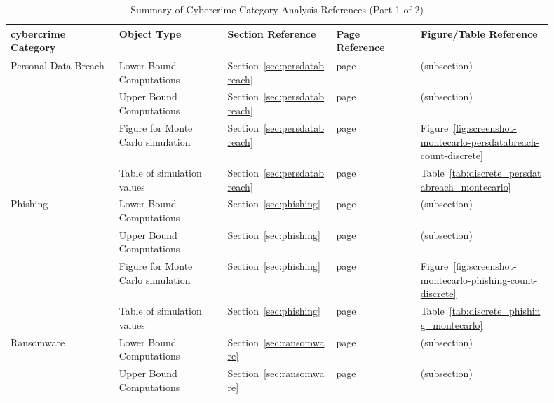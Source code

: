 \begin{table}[H]
  \centering
  \caption{Summary of Cybercrime Category Analysis References (Part 1 of 2)}
  \label{tab:cybercrime-anova-summary-1}
  \small
  \begin{tabular}{@{}p{0.18\linewidth}p{0.18\linewidth}p{0.18\linewidth}p{0.14\linewidth}p{0.22\linewidth}@{}}
    \toprule
    \textbf{\gls{cybercrime} Category} & \textbf{Object Type} & \textbf{Section Reference} & \textbf{Page Reference} & \textbf{Figure/Table Reference} \\
    \midrule
    Personal Data Breach & Lower Bound Computations & Section~\ref{sec:persdatabreach} & page~\pageref{sec:persdatabreach} & (subsection) \\
    & Upper Bound Computations & Section~\ref{sec:persdatabreach} & page~\pageref{sec:persdatabreach} & (subsection) \\
    & Figure for Monte Carlo simulation & Section~\ref{sec:persdatabreach} & page~\pageref{fig:screenshot-montecarlo-persdatabreach-count-discrete} & Figure~\ref{fig:screenshot-montecarlo-persdatabreach-count-discrete} \\
    & Table of simulation values & Section~\ref{sec:persdatabreach} & page~\pageref{tab:discrete_persdatabreach_montecarlo} & Table~\ref{tab:discrete_persdatabreach_montecarlo} \\
    \midrule
    Phishing\index{phishing} & Lower Bound Computations & Section~\ref{sec:phishing} & page~\pageref{sec:phishing} & (subsection) \\
    & Upper Bound Computations & Section~\ref{sec:phishing} & page~\pageref{sec:phishing} & (subsection) \\
    & Figure for Monte Carlo simulation & Section~\ref{sec:phishing} & page~\pageref{fig:screenshot-montecarlo-phishing-count-discrete} & Figure~\ref{fig:screenshot-montecarlo-phishing-count-discrete} \\
    & Table of simulation values & Section~\ref{sec:phishing} & page~\pageref{tab:discrete_phishing_montecarlo} & Table~\ref{tab:discrete_phishing_montecarlo} \\
    \midrule
    Ransomware\index{ransomware} & Lower Bound Computations & Section~\ref{sec:ransomware} & page~\pageref{sec:ransomware} & (subsection) \\
    & Upper Bound Computations & Section~\ref{sec:ransomware} & page~\pageref{sec:ransomware} & (subsection) \\

\end{tabular}
\end{table}
